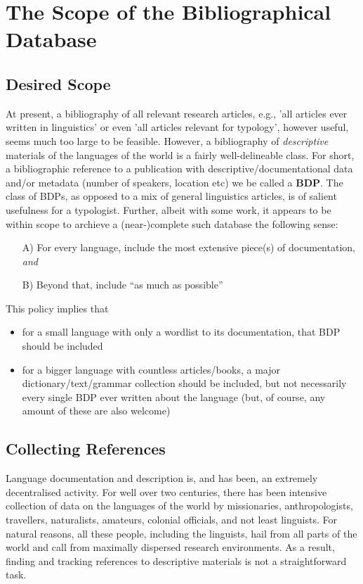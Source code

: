 \documentclass[english,11pt,twoside]{article}
\begin{document}
\section{The Scope of the Bibliographical Database}
\subsection{Desired Scope}
At present, a bibliography of all relevant research articles, e.g.,
'all articles ever written in linguistics' or even 'all articles
relevant for typology', however useful, seems much too large to be
feasible. However, a bibliography of \emph{descriptive} materials of
the languages of the world is a fairly well-delineable class. For
short, a bibliographic reference to a publication with
descriptive/documentational data and/or metadata (number of speakers,
location etc) we be called a {\bf BDP}. The class of BDPs, as opposed
to a mix of general linguistics articles, is of salient usefulness for
a typologist. Further, albeit with some work, it appears to be within
scope to archieve a (near-)complete such database the following sense:
\begin{itemize}
\item[A)] For every language, include the most extensive piece(s) of
  documentation, \emph{and}
\item[B)] Beyond that, include ``as much as possible''
\end{itemize}
This policy implies that
\begin{itemize}
\item for a small language with only a wordlist to its documentation, that BDP should be included
\item for a bigger language with countless articles/books, a major
  dictionary/text/grammar collection should be included, but not
  necessarily every single BDP ever written about the language (but,
  of course, any amount of these are also welcome)
\end{itemize}

\subsection{Collecting References}
Language documentation and description is, and has been, an extremely
decentralised activity. For well over two centuries, there has been
intensive collection of data on the languages of the world by
missionaries, anthropologists, travellers, naturalists, amateurs,
colonial officials, and not least linguists. For natural reasons, all
these people, including the linguists, hail from all parts of the
world and call from maximally dispersed research environments. As a
result, finding and tracking references to descriptive materials is
not a straightforward task.
\end{document}
